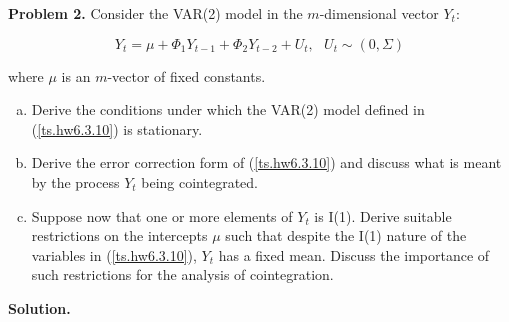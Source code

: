 \textbf{Problem 2.} Consider the VAR(2) model in the \(m\)-dimensional vector \(Y_t\):

\begin{equation}\label{ts.hw6.3.10}
Y_t = \mu + \Phi_1 Y_{t-1} + \Phi_2 Y_{t-2} + U_t, \ \ \ U_t \sim(0, \Sigma)
\end{equation}

where \(\mu\) is an \(m\)-vector of fixed constants.

\begin{enumerate}[(a)]

\item Derive the conditions under which the VAR(2) model defined in (\ref{ts.hw6.3.10}) is stationary.

\item Derive the error correction form of (\ref{ts.hw6.3.10}) and discuss what is meant by the process \(Y_t\) being cointegrated.

\item Suppose now that one or more elements of \(Y_t\) is I(1). Derive suitable restrictions on the intercepts \(\mu\) such that despite the I(1) nature of the variables in (\ref{ts.hw6.3.10}), \(Y_t\) has a fixed mean. Discuss the importance of such restrictions for the analysis of cointegration.

\end{enumerate}

\textbf{Solution.} 

